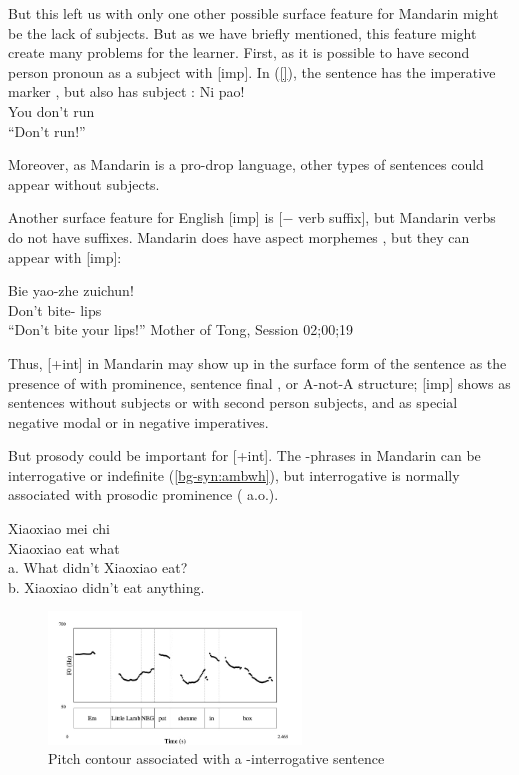 But this left us with only one other possible surface feature for Mandarin might be the lack of subjects. But as we have briefly mentioned, this feature might create many problems for the learner. First, as it is possible to have second person pronoun as a subject with [imp]. In (\ref{}), the sentence has the imperative marker , but also has subject :
\gll Ni  pao!\\
You don't run\\
``Don't run!''
\eex 

Moreover, as Mandarin is a pro-drop language, other types of sentences could appear without subjects. 

Another surface feature for English [imp] is [$-$ verb suffix], but Mandarin verbs do not have suffixes. Mandarin does have aspect morphemes , but they can appear with [imp]:  

\bex{}
Bie yao-zhe zuichun!\\
Don't bite-\Asp{} lips\\
``Don't bite your lips!'' \hfill Mother of Tong, Session 02;00;19
\eex

Thus, [+int] in Mandarin may show up in the surface form of the sentence as the presence of \twh{} with prominence, sentence final , or A-not-A structure; [imp] shows as sentences without subjects or with second person subjects, and as special negative modal  or  in negative imperatives. 



But prosody could be important for [+int]. The \twh-phrases in Mandarin can be interrogative or indefinite (\ref{bg-syn:ambwh}), but interrogative \twh{} is normally associated with prosodic prominence (\cite{hu2002prosody, dong2009, yangyang2018} a.o.).

\gll Xiaoxiao	mei	chi	\\
Xiaoxiao	\Neg{}	eat	what\\
a.	What didn't Xiaoxiao eat?\\
b.	Xiaoxiao didn't eat anything.\\
\eex

\begin{figure}[H]
    \centering
    \includegraphics[width=0.6\textwidth]{figures/pitch-FC1wh.jpg}
    \caption{Pitch contour associated with a \twh-interrogative sentence}
    \label{fig:man:wh1}
\end{figure}

